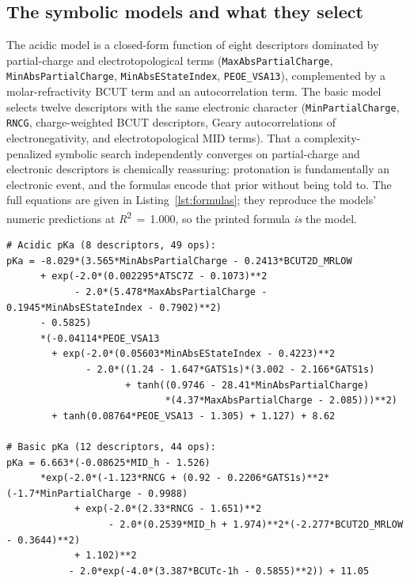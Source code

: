 \documentclass[11pt]{article}
\newcommand{\rtwo}{\textit{R}\textsuperscript{2}}
\begin{document}
\subsection{The symbolic models and what they select}

The acidic model is a closed-form function of eight descriptors dominated by partial-charge and
electrotopological terms (\texttt{MaxAbsPartialCharge}, \texttt{MinAbsPartialCharge},
\texttt{MinAbsEStateIndex}, \texttt{PEOE\_VSA13}), complemented by a molar-refractivity BCUT
term and an autocorrelation term. The basic model selects twelve descriptors with the same
electronic character (\texttt{MinPartialCharge}, \texttt{RNCG}, charge-weighted BCUT descriptors,
Geary autocorrelations of electronegativity, and electrotopological MID terms). That a
complexity-penalized symbolic search independently converges on partial-charge and electronic
descriptors is chemically reassuring: protonation is fundamentally an electronic event, and the
formulas encode that prior without being told to. The full equations are given in
Listing~\ref{lst:formulas}; they reproduce the models' numeric predictions at \rtwo{}\,$=$\,1.000,
so the printed formula \emph{is} the model.

\begin{lstlisting}[float=t,caption={The fitted symbolic models (descriptor names substituted
back from the symbolic search). Each equation reproduces its model's predictions exactly.},
label={lst:formulas}]
# Acidic pKa (8 descriptors, 49 ops):
pKa = -8.029*(3.565*MinAbsPartialCharge - 0.2413*BCUT2D_MRLOW
      + exp(-2.0*(0.002295*ATSC7Z - 0.1073)**2
            - 2.0*(5.478*MaxAbsPartialCharge - 0.1945*MinAbsEStateIndex - 0.7902)**2)
      - 0.5825)
      *(-0.04114*PEOE_VSA13
        + exp(-2.0*(0.05603*MinAbsEStateIndex - 0.4223)**2
              - 2.0*((1.24 - 1.647*GATS1s)*(3.002 - 2.166*GATS1s)
                     + tanh((0.9746 - 28.41*MinAbsPartialCharge)
                            *(4.37*MaxAbsPartialCharge - 2.085)))**2)
        + tanh(0.08764*PEOE_VSA13 - 1.305) + 1.127) + 8.62

# Basic pKa (12 descriptors, 44 ops):
pKa = 6.663*(-0.08625*MID_h - 1.526)
      *exp(-2.0*(-1.123*RNCG + (0.92 - 0.2206*GATS1s)**2*(-1.7*MinPartialCharge - 0.9988)
            + exp(-2.0*(2.33*RNCG - 1.651)**2
                  - 2.0*(0.2539*MID_h + 1.974)**2*(-2.277*BCUT2D_MRLOW - 0.3644)**2)
            + 1.102)**2
           - 2.0*exp(-4.0*(3.387*BCUTc-1h - 0.5855)**2)) + 11.05
\end{lstlisting}
\end{document}
